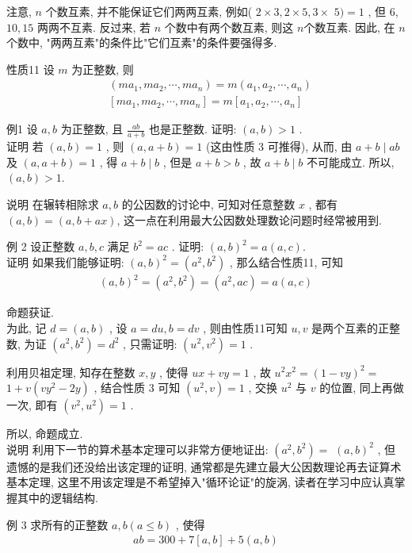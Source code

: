 注意,  $n$ 个数互素, 并不能保证它们两两互素, 例如( $2 \times 3,2 \times 5,3 \times$ $5 )=1$ , 但 6,  $10 ,  15$ 两两不互素. 反过来, 若 $n$ 个数中有两个数互素, 则这 $n$个数互素. 因此, 在 $n$ 个数中, "两两互素"的条件比"它们互素"的条件要强得多.

性质11 设 $m$ 为正整数, 则\begin{align}
	 & \left(m a_{1}, m a_{2}, \cdots, m a_{n}\right)=m\left(a_{1}, a_{2}, \cdots, a_{n}\right)   \\
	 & {\left[m a_{1}, m a_{2}, \cdots, m a_{n}\right]=m\left[a_{1}, a_{2}, \cdots, a_{n}\right]}
\end{align}

例1 设 $a ,  b$ 为正整数, 且 $\frac{a b}{a+b}$ 也是正整数. 证明:  $(a, b)>1$ . \\
证明 若 $(a, b)=1$ , 则 $(a, a+b)=1$ (这由性质 3 可推得), 从而, 由 $a+b \mid a b$ 及 $(a, a+b)=1$ , 得 $a+b \mid b$ , 但是 $a+b>b$ , 故 $a+b \mid b$ 不可能成立. 所以,  $(a, b)>1$.

说明 在辗转相除求 $a ,  b$ 的公因数的讨论中, 可知对任意整数 $x$ , 都有 $(a, b)=(a, b+a x)$, 这一点在利用最大公因数处理数论问题时经常被用到.

例 2 设正整数 $a ,  b ,  c$ 满足 $b^{2}=a c$ . 证明: $(a, b)^{2}=a(a, c)$.\\
证明 如果我们能够证明:  $(a, b)^{2}=\left(a^{2}, b^{2}\right)$ , 那么结合性质11, 可知
\begin{align*}
	(a, b)^{2}=\left(a^{2}, b^{2}\right)=\left(a^{2}, a c\right)=a(a, c)
\end{align*}

命题获证.\\
为此, 记 $d=(a, b)$ , 设 $a=d u, b=d v$ , 则由性质11可知 $u ,  v$ 是两个互素的正整数, 为证 $\left(a^{2}, b^{2}\right)=d^{2}$ , 只需证明:  $\left(u^{2}, v^{2}\right)=1$ .

利用贝祖定理, 知存在整数 $x ,  y$ , 使得 $u x+v y=1$ , 故 $u^{2} x^{2}=(1-v y)^{2}=$ $1+v\left(v y^{2}-2 y\right)$ , 结合性质 3 可知 $\left(u^{2}, v\right)=1$ , 交换 $u^{2}$ 与 $v$ 的位置, 同上再做一次, 即有 $\left(v^{2}, u^{2}\right)=1$ .

所以, 命题成立. \\
说明 利用下一节的算术基本定理可以非常方便地证出:  $\left(a^{2}, b^{2}\right)=$ $(a, b)^{2}$ , 但遗憾的是我们还没给出该定理的证明, 通常都是先建立最大公因数理论再去证算术基本定理, 这里不用该定理是不希望掉入"循环论证"的旋涡, 读者在学习中应认真掌握其中的逻辑结构.

例 3 求所有的正整数 $a ,  b(a \leqslant b)$ , 使得
\begin{align*}
	a b=300+7[a, b]+5(a, b)
\end{align*}

